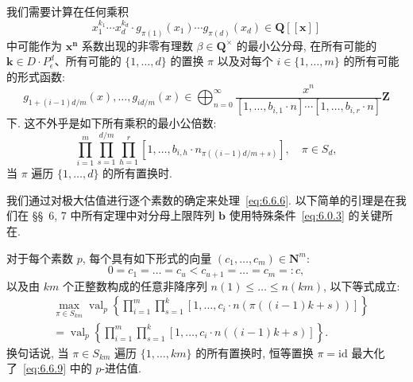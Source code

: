 我们需要计算在任何乘积
\begin{equation}\label{eq:6.6.4}
x_1^{k_1} \cdots x_d^{k_d} \cdot g_{\pi(1)}(x_1) \cdots g_{\pi(d)}(x_d) \in \mathbf{Q}[\![\mathbf{x}]\!]
\end{equation}
中可能作为 $\mathbf{x}^{\mathbf{n}}$ 系数出现的非零有理数 $\beta \in \mathbf{Q}^{\times}$ 的最小公分母, 在所有可能的 $\mathbf{k} \in D \cdot P^d_{\epsilon}$、所有可能的 $\{1, \dots, d\}$ 的置换 $\pi$ 以及对每个 $i \in \{1, \dots, m\}$ 的所有可能的形式函数:
\begin{equation}\label{eq:6.6.5}
g_{1+(i-1)d/m}(x), \dots, g_{id/m}(x) \in \bigoplus_{n=0}^{\infty} \frac{x^n}{[1, \dots, b_{i,1} \cdot n] \cdots [1, \dots, b_{i,r} \cdot n]} \mathbf{Z}
\end{equation}
下.
这不外乎是如下所有乘积的最小公倍数:
\begin{equation}\label{eq:6.6.6}
\prod_{i=1}^{m} \prod_{s=1}^{d/m} \prod_{h=1}^{r} \left[ 1, \dots, b_{i,h} \cdot n_{\pi((i-1)d/m+s)} \right], \quad \pi \in S_d,
\end{equation}
当 $\pi$ 遍历 $\{1, \dots, d\}$ 的所有置换时.

我们通过对极大估值进行逐个素数的确定来处理~\eqref{eq:6.6.6}.
以下简单的引理是在我们在 \S\S~6, 7 中所有定理中对分母上限阵列 $\mathbf{b}$ 使用特殊条件~\eqref{eq:6.0.3} 的关键所在.

\begin{lemma}\label{lem:6.6.7}
对于每个素数 $p$, 每个具有如下形式的向量 $(c_1, \dots, c_m) \in \mathbf{N}^m$:
\begin{equation}\label{eq:6.6.8}
0 = c_1 = \dots = c_u < c_{u+1} = \dots = c_m =: c,
\end{equation}
以及由 $km$ 个正整数构成的任意非降序列 $n(1) \leq \dots \leq n(km)$, 以下等式成立:
\begin{align}
&\max_{\pi \in S_{km}} \operatorname{val}_{p} \left\{ \prod_{i=1}^{m} \prod_{s=1}^{k} \left[ 1, \dots, c_{i} \cdot n \left( \pi \left( (i-1)k + s \right) \right) \right] \right\} \nonumber\\
&= \operatorname{val}_{p} \left\{ \prod_{i=1}^{m} \prod_{s=1}^{k} \left[ 1, \dots, c_{i} \cdot n \left( (i-1)k + s \right) \right] \right\}.\label{eq:6.6.9}
\end{align}
换句话说, 当 $\pi \in S_{km}$ 遍历 $\{1, \dots, km\}$ 的所有置换时, 恒等置换 $\pi = \mathrm{id}$ 最大化了~\eqref{eq:6.6.9} 中的 $p$-进估值.
\end{lemma}

